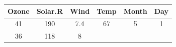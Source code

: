 \documentclass[]{article}
\theoremstyle{definition}
\theoremstyle{definition}
\theoremstyle{definition}
\theoremstyle{remark}
\begin{document}
\begin{longtable}[]{@{}cccccc@{}}
\toprule
\begin{minipage}[b]{0.09\columnwidth}\centering\strut
Ozone\strut
\end{minipage} & \begin{minipage}[b]{0.12\columnwidth}\centering\strut
Solar.R\strut
\end{minipage} & \begin{minipage}[b]{0.08\columnwidth}\centering\strut
Wind\strut
\end{minipage} & \begin{minipage}[b]{0.08\columnwidth}\centering\strut
Temp\strut
\end{minipage} & \begin{minipage}[b]{0.09\columnwidth}\centering\strut
Month\strut
\end{minipage} & \begin{minipage}[b]{0.06\columnwidth}\centering\strut
Day\strut
\end{minipage}\tabularnewline
\midrule
\endhead
\begin{minipage}[t]{0.09\columnwidth}\centering\strut
41\strut
\end{minipage} & \begin{minipage}[t]{0.12\columnwidth}\centering\strut
190\strut
\end{minipage} & \begin{minipage}[t]{0.08\columnwidth}\centering\strut
7.4\strut
\end{minipage} & \begin{minipage}[t]{0.08\columnwidth}\centering\strut
67\strut
\end{minipage} & \begin{minipage}[t]{0.09\columnwidth}\centering\strut
5\strut
\end{minipage} & \begin{minipage}[t]{0.06\columnwidth}\centering\strut
1\strut
\end{minipage}\tabularnewline
\begin{minipage}[t]{0.09\columnwidth}\centering\strut
36\strut
\end{minipage} & \begin{minipage}[t]{0.12\columnwidth}\centering\strut
118\strut
\end{minipage} & \begin{minipage}[t]{0.08\columnwidth}\centering\strut
8\strut
\end{minipage} & \begin{minipage}[t]{0.08\columnwidth}\centering\strut

\end{minipage}
\end{longtable}
\end{document}
